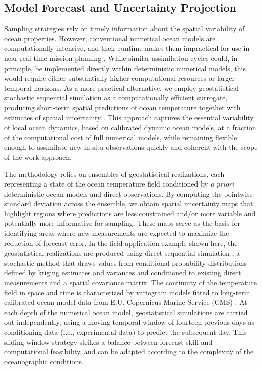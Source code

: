 \subsection{Model Forecast and Uncertainty Projection}

Sampling strategies rely on timely information about the spatial
variability of ocean properties. However, conventional numerical ocean
models are computationally intensive, and their runtime makes them
impractical for use in near-real-time mission planning . While similar assimilation cycles could, in
principle, be implemented directly within deterministic numerical
models, this would require either substantially higher computational
resources or larger temporal horizons. As a more practical
alternative, we employ geostatistical stochastic sequential simulation
as a computationally efficient surrogate, producing short-term spatial
predictions of ocean temperature together with estimates of spatial
uncertainty \cite{deutsch1992}. This approach captures the essential
variability of local ocean dynamics, based on calibrated dynamic ocean
models, at a fraction of the computational cost of full numerical
models, while remaining flexible enough to assimilate new in situ
observations quickly \cite{Duarte2025} and coherent with the scope of
the work approach.

The methodology relies on ensembles of geostatistical realizations,
each representing a state of the ocean temperature field conditioned
by \emph{a priori} deterministic ocean models \cite{CMEMS2017} and
direct observations. By computing the pointwise standard deviation
across the ensemble, we obtain spatial uncertainty maps that highlight
regions where predictions are less constrained and/or more variable
and potentially more informative for sampling. These maps serve as the
basis for identifying areas where new measurements are expected to
maximize the reduction of forecast error. In the field application
example shown here, the geostatistical realizations are produced using
direct sequential simulation \cite{soares2001direct}, a stochastic
method that draws values from conditional probability distributions
defined by kriging estimates and variances and conditioned to existing
direct measurements and a spatial covariance matrix. The continuity of
the temperature field in space and time is characterized by variogram
models fitted to long-term calibrated ocean model data from
E.U. Copernicus Marine Service (CMS) \cite{CMEMS2017}. At each depth
of the numerical ocean model, geostatistical simulations are carried
out independently, using a moving temporal window of fourteen previous
  days as
conditioning data (i.e., experimental data) to predict the subsequent
day. This sliding-window strategy strikes a balance between forecast
skill and computational feasibility, and can be adapted according to
the complexity of the oceanographic conditions.

